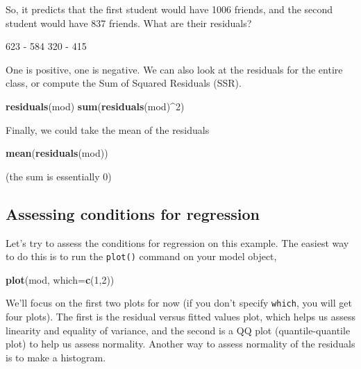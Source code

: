 \documentclass[]{article}
\newenvironment{Shaded}{\begin{snugshade}}{\end{snugshade}}
\newcommand{\KeywordTok}[1]{\textcolor[rgb]{0.13,0.29,0.53}{\textbf{{#1}}}}
\newcommand{\DataTypeTok}[1]{\textcolor[rgb]{0.13,0.29,0.53}{{#1}}}
\newcommand{\DecValTok}[1]{\textcolor[rgb]{0.00,0.00,0.81}{{#1}}}
\newcommand{\StringTok}[1]{\textcolor[rgb]{0.31,0.60,0.02}{{#1}}}
\newcommand{\NormalTok}[1]{{#1}}
\begin{document}
So, it predicts that the first student would have 1006 friends, and the
second student would have 837 friends. What are their residuals?

\begin{Shaded}
\begin{Highlighting}[]
\DecValTok{623} \NormalTok{-}\StringTok{ }\DecValTok{584}
\DecValTok{320} \NormalTok{-}\StringTok{ }\DecValTok{415}
\end{Highlighting}
\end{Shaded}

One is positive, one is negative. We can also look at the residuals for
the entire class, or compute the Sum of Squared Residuals (SSR).

\begin{Shaded}
\begin{Highlighting}[]
\KeywordTok{residuals}\NormalTok{(mod)}
\KeywordTok{sum}\NormalTok{(}\KeywordTok{residuals}\NormalTok{(mod)^}\DecValTok{2}\NormalTok{) }
\end{Highlighting}
\end{Shaded}

Finally, we could take the mean of the residuals

\begin{Shaded}
\begin{Highlighting}[]
\KeywordTok{mean}\NormalTok{(}\KeywordTok{residuals}\NormalTok{(mod))}
\end{Highlighting}
\end{Shaded}

(the sum is essentially 0)

\subsection{Assessing conditions for
regression}\label{assessing-conditions-for-regression}

Let's try to assess the conditions for regression on this example. The
easiest way to do this is to run the \texttt{plot()} command on your
model object,

\begin{Shaded}
\begin{Highlighting}[]
\KeywordTok{plot}\NormalTok{(mod, }\DataTypeTok{which=}\KeywordTok{c}\NormalTok{(}\DecValTok{1}\NormalTok{,}\DecValTok{2}\NormalTok{))}
\end{Highlighting}
\end{Shaded}

We'll focus on the first two plots for now (if you don't specify
\texttt{which}, you will get four plots). The first is the residual
versus fitted values plot, which helps us assess linearity and equality
of variance, and the second is a QQ plot (quantile-quantile plot) to
help us assess normality. Another way to assess normality of the
residuals is to make a histogram.
\end{document}
